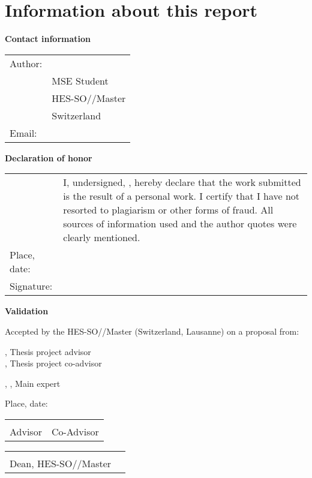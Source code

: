 \chapter*{Information about this report}

\vspace{\fill}

\textbf{Contact information}

\begin{tabularx}{\textwidth}{N{2.5cm}X}
	Author:	 & \AuthorFirstName\ \AuthorLastName \\
	& MSE Student \\
	& HES-SO//Master \\
	& Switzerland \\
	Email: & \email{\AuthorEmail}
\end{tabularx}

\vspace{\fill}

\textbf{Declaration of honor}

{\renewcommand{\arraystretch}{2}
\begin{tabularx}{\textwidth}{N{2.5cm}X}
	& I, undersigned, \Author, hereby declare that the work submitted is 
	the result of a personal work. I certify that I have not resorted to 
	plagiarism or other forms of fraud. All sources of information used and the 
	author quotes were clearly mentioned. \\
	Place, date: & \underline{\hspace{7cm}} \\ 
	Signature: & \underline{\hspace{7cm}}
\end{tabularx}
}

\vspace{\fill}

\textbf{Validation}

Accepted by the HES-SO//Master (Switzerland, Lausanne) on a proposal from:

\vspace{0.5cm}

\Advisor, Thesis project advisor \\
\CoAdvisor, Thesis project co-advisor

\Expert, \ExpertLab, Main expert

\vspace{1cm}

Place, date: \underline{\hspace{8cm}}

\vspace{2cm}

{ \renewcommand{\arraystretch}{1.5}
\begin{tabularx}{\textwidth}{X X}
	\Advisor  & \CoAdvisor \\
	Advisor   & Co-Advisor\\
\end{tabularx}
}

\vspace{0.4cm}

{ \renewcommand{\arraystretch}{1.5}
\vspace{1cm}
\begin{tabularx}{\textwidth}{X X}
	\Dean\\ 
	Dean, HES-SO//Master\\
\end{tabularx}
}
